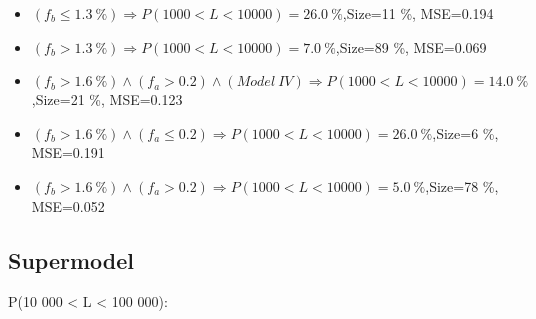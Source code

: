 \documentclass[numbered]{CSL}
\begin{document}
\begin{itemize}
\item $(f_b \leq 1.3~\%) \Rightarrow P(1 000 < L < 10 000) = 26.0~\%$,\hfill Size=11 \%, MSE=0.194
\item $(f_b > 1.3~\%) \Rightarrow P(1 000 < L < 10 000) = 7.0~\%$,\hfill Size=89 \%, MSE=0.069
\item $(f_b > 1.6~\%) \land (f_a > 0.2) \land (Model~IV) \Rightarrow P(1 000 < L < 10 000) = 14.0~\%$,\hfill Size=21 \%, MSE=0.123
\item $(f_b > 1.6~\%) \land (f_a \leq 0.2) \Rightarrow P(1 000 < L < 10 000) = 26.0~\%$,\hfill Size=6 \%, MSE=0.191
\item $(f_b > 1.6~\%) \land (f_a > 0.2) \Rightarrow P(1 000 < L < 10 000) = 5.0~\%$,\hfill Size=78 \%, MSE=0.052
\end{itemize}

\subsection{Supermodel}
P(10 000 < L < 100 000):
\end{document}
